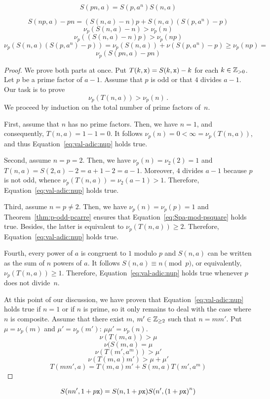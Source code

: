  $$
 S(p n, a) = S(p, a^n) S(n, a) 
 $$

 $$
 S(np, a) - pn = (S(n, a) - n) p + S(n, a) (S(p, a^n) - p) 
 $$
 $$
 \nu_p(S(n, a) - n) > \nu_p(n) 
 $$
 $$
 \nu_p((S(n, a) - n) p) > \nu_p(np) 
 $$
 $$
\nu_p( S(n, a) (S(p, a^n) - p) ) = \nu_p(S(n, a)) + \nu(S(p, a^n) - p) \ge \nu_p(np) = 
 $$
 $$
 \nu_p(S(pn, a) - pn) 
 $$

 
 \begin{proof}
   We prove both parts at once.
   Put $T(k, \mathtt{x})  = S(k, \mathtt{x}) - k$ for each $k \in \mathbb{Z}_{> 0}$.
   Let $p$ be a prime factor of $a - 1$.
   Assume that $p$ is odd or that $4$ divides $a - 1$.
   Our task is to prove
   \begin{equation}  \label{eq:val-adic:nup}
   \nu_p(T(n, a)) > \nu_p(n) \, . 
   \end{equation}
   We proceed by induction on the total number of prime factors of~$n$.

   First, assume that $n$ has no prime factors.
   Then, we have $n = 1$, and consequently, $T(n, a)  = 1 - 1 = 0$.
   It follows $\nu_p(n) = 0 < \infty = \nu_p(T(n, a))$,
   and thus Equation~\eqref{eq:val-adic:nup} holds true.

   Second, assume $n = p = 2$.
   Then, we have
   $\nu_p(n) = \nu_2(2) = 1$
   and 
   $T(n, a) = S(2, a) - 2 = a + 1 - 2 = a - 1$.
   Moreover, $4$ divides $a - 1$ because $p$ is not odd,
   whence $\nu_p(T(n, a)) = \nu_2(a - 1) > 1$.
   Therefore, Equation~\eqref{eq:val-adic:nup} holds true.

   Third, assume $n = p \ne 2$.
   Then,
   we have $\nu_p(n) = \nu_p(p) = 1$
   and
   Theorem~\ref{thm:p-odd-pcarre} ensures that Equation~\eqref{eq:Spa-mod-psquare} holds true.
   Besides, the latter is equivalent to $\nu_p(T(n, a)) \ge 2$.
   Therefore, Equation~\eqref{eq:val-adic:nup} holds true.

   Fourth, every power of $a$ is congruent to $1$ modulo $p$
   and
   $S(n, a)$ can be written as the sum of $n$ powers of $a$.
   It follows $S(n, a) \equiv n \pmod {p}$, or equivalently, $\nu_p(T(n, a)) \ge 1$.
   Therefore, Equation~\eqref{eq:val-adic:nup} holds true whenever $p$ does not divide~$n$.
 
   At this point of our discussion,
   we have proven that Equation~\eqref{eq:val-adic:nup} holds true if $n = 1$ or if $n$ is prime,
   so it only remains to deal with the case where $n$ is composite.
   Assume that there exist $m$, $m' \in \mathbb{Z}_{\ge 2}$ such that $n = mm'$.
   Put $\mu = \nu_p(m)$ and $\mu' = \nu_p(m')$: $\mu\mu' = \nu_p(n)$.
   $$
   \nu(T(m, a)) > \mu
   $$
   $$
   \nu(S(m, a) = \mu
   $$
   $$
   \nu(T(m', a^m)) > \mu'
   $$
   $$
   \nu(T(m, a) m') > \mu + \mu' 
   $$
   $$
   T(mm', a) = T(m, a) m' +  S(m, a) T(m', a^m) 
   $$
 \end{proof}

   $$
   S(nn', 1 + p \mathtt{x}) 
   =
   S(n, 1 + p \mathtt{x})  S(n', {(1 + p \mathtt{x})}^n)
   $$

 